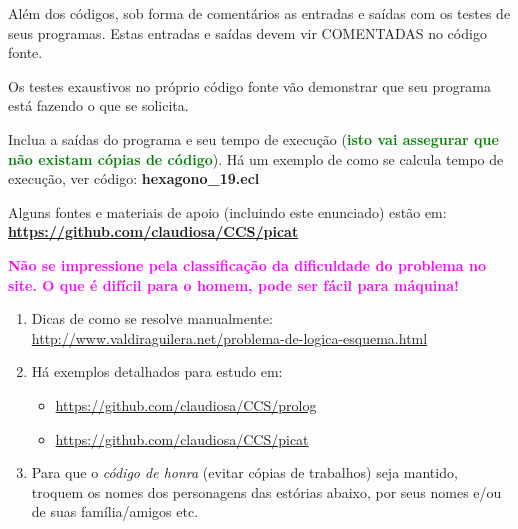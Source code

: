 \documentclass[a4paper,12pt]{article}
\begin{document}
\begin{flushleft}
\vspace{0.5cm}
 Além dos códigos, sob forma de comentários as 
entradas e saídas com os testes de seus programas. Estas
entradas e saídas devem vir COMENTADAS no código fonte.

\vspace{0.5cm}
 Os testes exaustivos no próprio código fonte vão demonstrar que seu programa está fazendo o que se solicita.

\vspace{0.5cm}
 Inclua a saídas do programa e seu tempo de execução (\textbf{\textcolor{green}{isto vai assegurar que não existam cópias de código}}). Há um exemplo de como se calcula tempo de execução, ver código: \textbf{hexagono\_19.ecl}

\vspace{0.5cm}
 Alguns fontes e materiais de apoio (incluindo este enunciado) estão em: \textbf{\url{https://github.com/claudiosa/CCS/picat}} 

\vspace{0.5cm}
 \textbf{\textcolor{magenta}{Não se impressione pela classificação da dificuldade do problema no site. O que é difícil para o homem, pode ser fácil para máquina!}}

\end{flushleft}


\begin{enumerate}
\setlength\itemsep{0.1cm}
\item Dicas de como se resolve manualmente:\\
\url{http://www.valdiraguilera.net/problema-de-logica-esquema.html}

\item Há exemplos detalhados para estudo em:
\begin{itemize}
  \item  \url{https://github.com/claudiosa/CCS/prolog} 
  \item  \url{https://github.com/claudiosa/CCS/picat}
\end{itemize}




\item Para que o \textit{código de honra} (evitar cópias de trabalhos) seja mantido, troquem os nomes dos personagens das estórias abaixo, por seus nomes e/ou de suas família/amigos etc. 

\end{enumerate}
\end{document}
